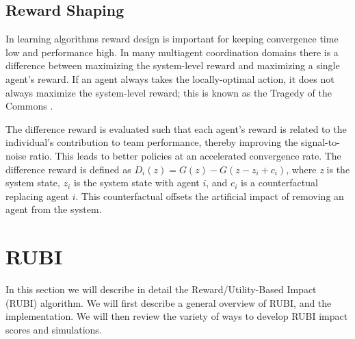 \documentclass[letterpaper]{article}
\begin{document}
\subsection{Reward Shaping}

In learning algorithms reward design is important for keeping convergence time low and performance high. In many multiagent coordination domains there is a difference between maximizing the system-level reward and maximizing a single agent's reward. If an agent always takes the locally-optimal action, it does not always maximize the system-level reward; this is known as the Tragedy of the Commons \cite{Hardin}.

The difference reward \cite{tumer-wolpert_jair02} is evaluated such that each agent's reward is related to the individual's contribution to team performance, thereby improving the signal-to-noise ratio. This leads to better policies at an accelerated convergence rate. The difference reward is defined as $D_i(z) = G(z) - G(z - z_i + c_i)$, where \textit{z} is the system state, $z_i$ is the system state with agent $i$, and $c_i$ is a counterfactual replacing agent $i$. This counterfactual offsets the artificial impact of removing an agent from the system.


\section{RUBI}
In this section we will describe in detail the Reward/Utility-Based Impact (RUBI) algorithm. We will first describe a general overview of RUBI, and the implementation. We will then review the variety of ways to develop RUBI impact scores and simulations.
\end{document}
